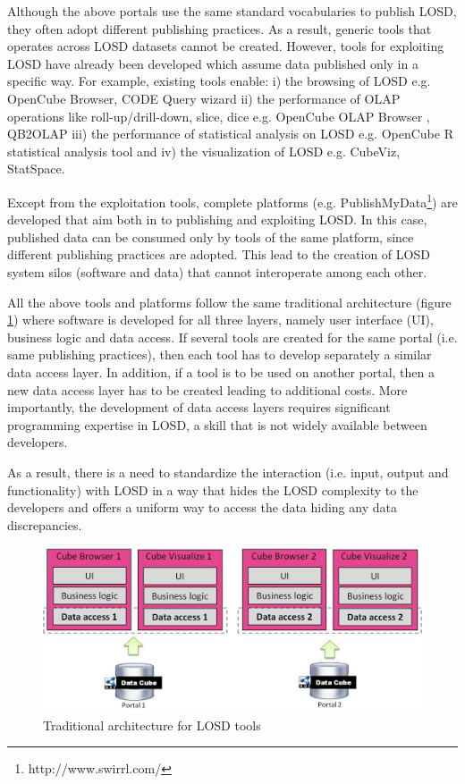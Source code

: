 \documentclass{llncs}
\begin{document}
Although the above portals use the same standard vocabularies to publish LOSD, they often adopt different publishing practices. As a result, generic tools that operates across LOSD datasets cannot be created. However, tools for exploiting LOSD have already been developed which assume data published only in a specific way. For example, existing tools enable: i) the browsing of LOSD e.g. OpenCube Browser\cite{Kalampokis:2014}, CODE Query wizard\cite{CODE:2014} ii) the performance of OLAP operations like roll-up/drill-down, slice, dice e.g. OpenCube OLAP Browser \cite{KalampokisIAOS}, QB2OLAP\cite{QB2OLAP} iii) the performance of  statistical analysis on LOSD e.g. OpenCube R statistical analysis tool\cite{Kalampokis:2014} and iv) the visualization of LOSD e.g. CubeViz\cite{Cubeviz}, StatSpace\cite{Statspace}.

Except from the exploitation tools, complete platforms (e.g. PublishMyData\footnote{http://www.swirrl.com/}) are developed that aim both in to publishing and exploiting LOSD. In this case, published data can be consumed only by tools of the same platform, since different publishing practices are adopted. This lead to the creation of LOSD system silos (software and data) that cannot interoperate among each other.

All the above tools and platforms follow the same traditional architecture (figure \ref{fig:asis}) where software is developed for all three layers, namely user interface (UI), business logic and data access. If several tools are created for the same portal (i.e. same publishing practices), then each tool has to develop separately  a similar data access layer. In addition, if a tool is to be used on another portal, then a new data access layer has to be created leading to additional costs. More importantly, the development of data access layers requires significant programming expertise in LOSD, a skill that is not widely available between developers.

As a result, there is a need to standardize the interaction (i.e. input, output and functionality) with LOSD in a way that hides the LOSD complexity to the developers and offers a uniform way to access the data hiding any data discrepancies. 

\begin{figure}
\begin{center}
  \includegraphics[width=120mm]{images/asis.jpg}
  \end{center}
\caption{Traditional architecture for LOSD tools}
\label{fig:asis}
\end{figure}
\end{document}
